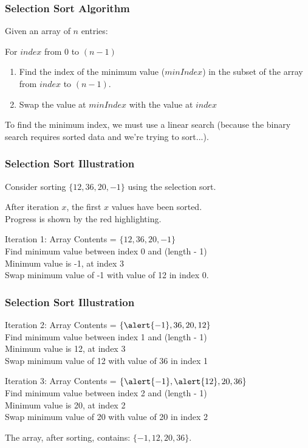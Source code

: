\begin{frame}
\frametitle{Selection Sort Algorithm}


Given an array of $n$ entries:

For $index$ from 0 to $(n - 1)$\\
	\begin{enumerate}
		\item Find the index of the minimum value ($minIndex$) in the subset of the array from $index$ to $(n-1)$.
		\item Swap the value at $minIndex$ with the value at $index$
\end{enumerate}

To find the minimum index, we must use a linear search (because the binary search requires sorted data and we're trying to sort...).

\end{frame}

\begin{frame}
\frametitle{Selection Sort Illustration}
Consider sorting $\{12, 36, 20, -1\}$ using the selection sort.

After iteration $x$, the first $x$ values have been sorted.\\
Progress is shown by the red highlighting.

Iteration 1: Array Contents = $\{12, 36, 20, -1\}$\\
\quad Find minimum value between index 0 and (length - 1)\\
\quad Minimum value is -1, at index 3\\
\quad Swap minimum value of -1 with value of 12 in index 0.

\end{frame}

\begin{frame}
\frametitle{Selection Sort Illustration}
Iteration 2: Array Contents = $\{\alert{-1}, 36, 20, 12\}$\\
\quad Find minimum value between index 1 and (length - 1)\\
\quad Minimum value is 12, at index 3\\
\quad Swap minimum value of 12 with value of 36 in index 1
		
Iteration 3: Array Contents = $\{\alert{-1}, \alert{12}, 20, 36\}$\\
\quad Find minimum value between index 2 and (length - 1)\\
\quad Minimum value is 20, at index 2\\
\quad Swap minimum value of 20 with value of 20 in index 2

The array, after sorting, contains: $\{-1, 12, 20, 36\}$.

\end{frame}

